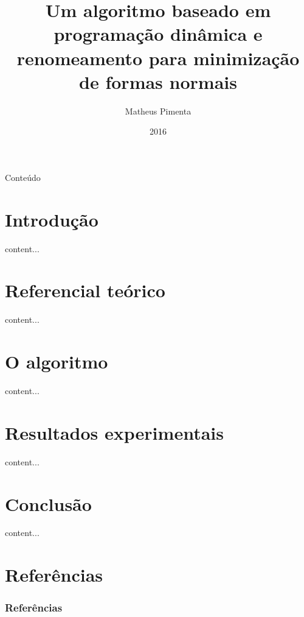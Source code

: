 \documentclass{beamer}
\title[]{Um algoritmo baseado em programação dinâmica e renomeamento para minimização de formas normais}
\author{Matheus Pimenta}
\institute[UnB]{Universidade de Brasília}
\date{2016}
\begin{document}
\begin{frame}
\titlepage
\end{frame}

\begin{frame}{Conteúdo}
  \tableofcontents
\end{frame}

\section{Introdução}

\begin{frame}
	content...
\end{frame}

\section{Referencial teórico}

\begin{frame}
	content...
\end{frame}

\section{O algoritmo}

\begin{frame}
	content...
\end{frame}

\section{Resultados experimentais}

\begin{frame}
	content...
\end{frame}

\section{Conclusão}

\begin{frame}
	content...
\end{frame}

\section{Referências}

\begin{frame}[allowframebreaks]
  \frametitle{Referências}
  
  
\end{frame}
\end{document}
